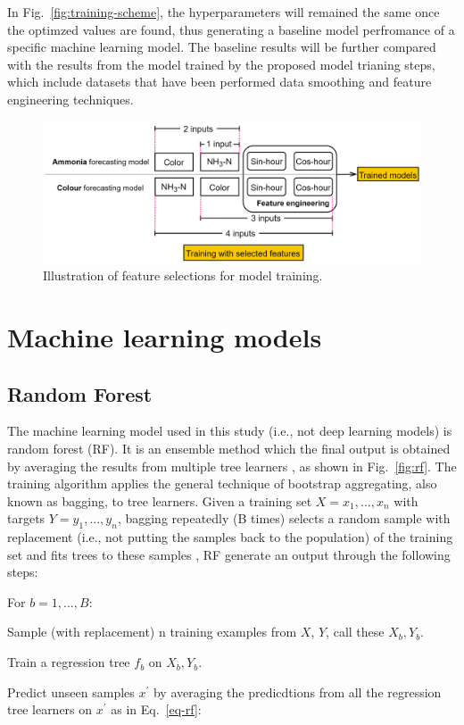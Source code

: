 In Fig.~\ref{fig:training-scheme}, the hyperparameters will remained the same once the optimzed values are found, thus generating a baseline model perfromance of a specific machine learning model. The baseline results will be further compared with the results from the model trained by the proposed model trianing steps, which include datasets that have been performed data smoothing and feature engineering techniques.

\begin{figure}[h]
    \centering
    \includegraphics[width=0.8\columnwidth]{imgs/pre-processing/feature-selection.png}
    \caption{Illustration of feature selections for model training.}
    \label{fig:feature-selection}
 \end{figure}

\section{Machine learning models}
\subsection{Random Forest}
The machine learning model used in this study (i.e., not deep learning models) is random forest (RF). It is an ensemble method which the final output is obtained by averaging the results from multiple tree learners \citep{wangMachineLearningFramework2021}, as shown in Fig.~\ref{fig:rf}. The training algorithm applies the general technique of bootstrap aggregating, also known as bagging, to tree learners. Given a training set $X = x_1, ..., x_n$ with targets $Y = y_1, ..., y_n$, bagging repeatedly (B times) selects a random sample with replacement (i.e., not putting the samples back to the population) of the training set and fits trees to these samples \citep{wikipediaRandomForest2022}, RF generate an output through the following steps:

For $b=1, ..., B:$

\noindent
\begin{myenumerate}
  \item Sample (with replacement) n training examples from $X$, $Y$, call these $X_b, Y_b$.
  \item Train a regression tree $f_b$ on $X_b, Y_b$.
  \item Predict unseen samples $x^{'}$ by averaging the predicdtions from all the regression tree learners on $x^{'}$ as in Eq.~\ref{eq-rf}:
\end{myenumerate}

